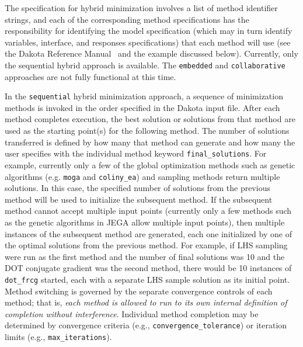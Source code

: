 The specification for hybrid minimization involves a list of
method identifier strings, and each of the corresponding method
specifications has the responsibility for identifying the model
specification (which may in turn identify variables, interface, and
responses specifications) that each method will use (see the Dakota
Reference Manual~\cite{RefMan} and the example discussed below).
Currently, only the sequential hybrid approach is available. The
\texttt{embedded} and \texttt{collaborative} approaches are
not fully functional at this time.

In the \texttt{sequential} hybrid minimization approach, a sequence
of minimization methods is invoked in the order specified in the
Dakota input file. After each method completes execution, 
the best solution or solutions from that method are used as the
starting point(s) for the following method. 
The number of solutions transferred 
is defined by how many that method can generate and how many the 
user specifies with the individual method keyword \texttt{final\_solutions}. 
For example, currently only a few of the global optimization methods such as 
genetic algorithms (e.g. \texttt{moga} and \texttt{coliny\_ea}) and 
sampling methods return multiple solutions.  In this case, 
the specified number of solutions from the previous 
method will be used to initialize the subsequent method.  If the subsequent 
method cannot accept multiple input points (currently only a few methods 
such as the genetic algorithms in JEGA allow multiple input points), then 
multiple instances of the subsequent method are generated, each one 
initialized by one of the optimal solutions from the previous method. 
For example, if LHS sampling were run as the first method and 
the number of final solutions was 10 and the DOT conjugate gradient 
was the second method, there would be 10 instances of \texttt{dot\_frcg} 
started, each with a separate LHS sample solution as its initial point. 
Method switching is governed
by the separate convergence controls of each method; that is,
\emph{each method is allowed to run to its own internal definition of
completion without interference}. Individual method completion may be
determined by convergence criteria (e.g.,
\texttt{convergence\_tolerance}) or iteration limits (e.g.,
\texttt{max\_iterations}).  


